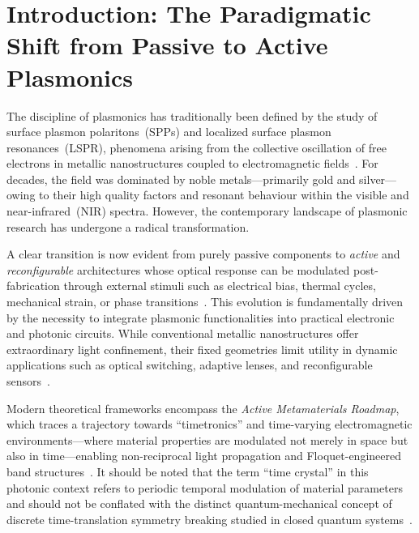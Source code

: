 \documentclass[twocolumn,10pt]{article}
\begin{document}
\section{Introduction: The Paradigmatic Shift from Passive to Active
Plasmonics}
\label{sec:intro}

The discipline of plasmonics has traditionally been defined by the study
of surface plasmon polaritons~(SPPs) and localized surface plasmon
resonances~(LSPR), phenomena arising from the collective oscillation of
free electrons in metallic nanostructures coupled to electromagnetic
fields~\cite{maier2007plasmonics,novotny2012principles}.  For decades,
the field was dominated by noble metals---primarily gold and silver---owing
to their high quality factors and resonant behaviour within the visible
and near-infrared~(NIR) spectra.  However, the contemporary landscape of
plasmonic research has undergone a radical transformation.

A clear transition is now evident from purely passive components to
\textit{active} and \textit{reconfigurable} architectures whose optical
response can be modulated post-fabrication through external stimuli such
as electrical bias, thermal cycles, mechanical strain, or phase
transitions~\cite{shaltout2019spatiotemporal,chen2016metasurface}.
This evolution is fundamentally driven by the necessity to integrate
plasmonic functionalities into practical electronic and photonic circuits.
While conventional metallic nanostructures offer extraordinary light
confinement, their fixed geometries limit utility in dynamic applications
such as optical switching, adaptive lenses, and reconfigurable
sensors~\cite{shaltout2019spatiotemporal,chen2016metasurface}.

Modern theoretical frameworks encompass the \textit{Active
Metamaterials Roadmap}, which traces a trajectory towards
``timetronics'' and time-varying electromagnetic
environments---where material properties are modulated not merely in
space but also in time---enabling non-reciprocal light propagation and
Floquet-engineered band structures~\cite{zheludev2012from,engheta2013pursuing,shaltout2019spatiotemporal}.
It should be noted that the term ``time crystal'' in this photonic
context refers to periodic temporal modulation of material parameters
and should not be conflated with the distinct quantum-mechanical concept
of discrete time-translation symmetry breaking studied in closed quantum
systems~\cite{zheludev2012from}.
\end{document}
